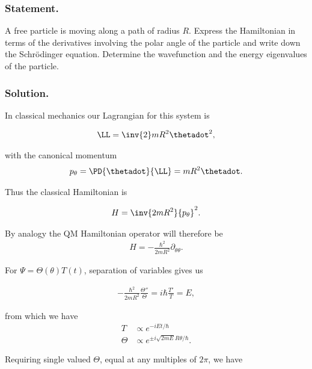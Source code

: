 \subsubsection{Statement.}

A free particle is moving along a path of radius $R$.  Express the Hamiltonian in terms of the derivatives involving the polar angle of the particle and write down the Schr\"{o}dinger equation.  Determine the wavefunction and the energy eigenvalues of the particle.

\subsubsection{Solution.}

In classical mechanics our Lagrangian for this system is

\begin{align}\label{eqn:desaiCh4:500}
\LL = \inv{2} m R^2 \thetadot^2,
\end{align}

with the canonical momentum
\begin{align}\label{eqn:desaiCh4:501}
p_\theta = \PD{\thetadot}{\LL} = m R^2 \thetadot.
\end{align}

Thus the classical Hamiltonian is

\begin{align}\label{eqn:desaiCh4:502}
H = \inv{2m R^2} {p_\theta}^2.
\end{align}

By analogy the QM Hamiltonian operator will therefore be
\begin{align}\label{eqn:desaiCh4:503}
H = -\frac{\hbar^2}{2m R^2} \partial_{\theta\theta}.
\end{align}

For $\Psi = \Theta(\theta) T(t)$, separation of variables gives us

\begin{align}\label{eqn:desaiCh4:n}
-\frac{\hbar^2}{2m R^2} \frac{\Theta''}{\Theta} = i \hbar \frac{T'}{T} = E,
\end{align}

from which we have
\begin{align}\label{eqn:desaiCh4:504}
T &\propto e^{-i E t/\hbar} \\
\Theta &\propto e^{ \pm i \sqrt{2m E} R \theta/\hbar }.
\end{align}

Requiring single valued $\Theta$, equal at any multiples of $2\pi$, we have

